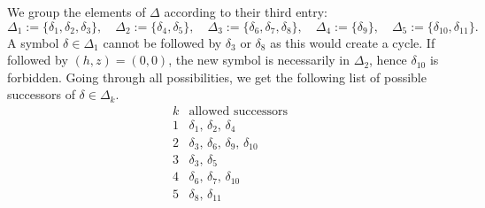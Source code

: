 \documentclass[11pt]{article}
\providecommand{\1}{\mathBB{1}}
\begin{document}
We group the elements of $\Delta$ according to their third entry:
$$
\Delta_1:=\{\delta_1,\delta_2,\delta_3\},\quad
\Delta_2:=\{\delta_4,\delta_5\},\quad
\Delta_3:=\{\delta_6,\delta_7,\delta_8\},\quad
\Delta_4:=\{\delta_9\},\quad
\Delta_5:=\{\delta_{10},\delta_{11}\}.
$$
A symbol $\delta\in\Delta_1$ cannot be followed by $\delta_3$ or $\delta_8$ as this would create a cycle. If followed by $(h,z)=(0,0)$, the new symbol is necessarily in $\Delta_2$, hence $\delta_{10}$ is forbidden. Going through all possibilities, we get the following list of possible successors of $\delta\in\Delta_k$.
\begin{equation}
\label{E6.02}
\begin{array}{c|l}
k&\mbox{allowed successors}\\\hline
1&\delta_1,\,\delta_2,\,\delta_4\\
2&\delta_3,\,\delta_6,\,\delta_9,\,\delta_{10}\\
3&\delta_3,\,\delta_5\\
4&\delta_6,\,\delta_7,\,\delta_{10}\\
5&\delta_8,\,\delta_{11}
\end{array}
\end{equation}
\end{document}
